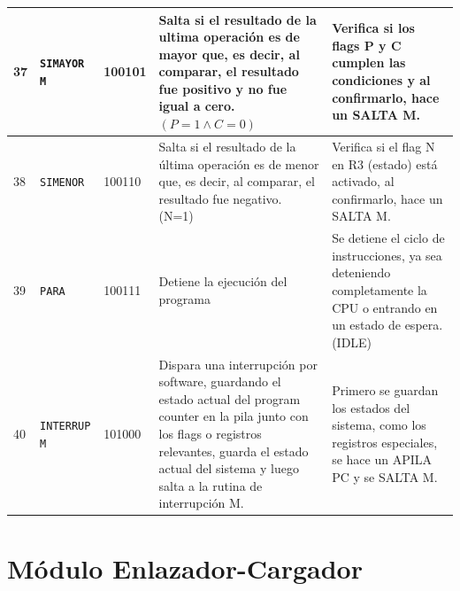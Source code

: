 \documentclass{article}
\begin{document}
\begin{longtable}{|p{}|p{}|p{}|p{}|p{}|}
  \hline
  37                 & \texttt{SIMAYOR M}                               & 100101                          & Salta si el resultado de la ultima operación es de mayor que, es decir, al comparar, el resultado fue positivo y no fue igual a cero. $(P = 1 \land C = 0)$                                                                   & Verifica si los flags P y C cumplen las condiciones y al confirmarlo, hace un SALTA M.                                 \\
  \hline
  38                 & \texttt{SIMENOR}                                 & 100110                          & Salta si el resultado de la última operación es de menor que, es decir, al comparar, el resultado fue negativo.  (N=1)                                                                                                        & Verifica si el flag N en R3 (estado) está activado, al confirmarlo, hace un SALTA M.                                   \\
  \hline
  39                 & \texttt{PARA}                                    & 100111                          & Detiene la ejecución del programa                                                                                                                                                                                             & Se detiene el ciclo de instrucciones, ya sea deteniendo completamente la CPU o entrando en un estado de espera. (IDLE) \\
  \hline
  40                 & \texttt{INTERRUP M}                              & 101000                          & Dispara una interrupción por software, guardando el estado actual del program counter en la pila junto con los flags o registros relevantes, guarda el estado actual del sistema y luego salta a la rutina de interrupción M. & Primero se guardan los estados del sistema, como los registros especiales, se hace un APILA PC y se SALTA M.           \\
  \hline
\end{longtable}




\section{Módulo Enlazador-Cargador}
\end{document}
